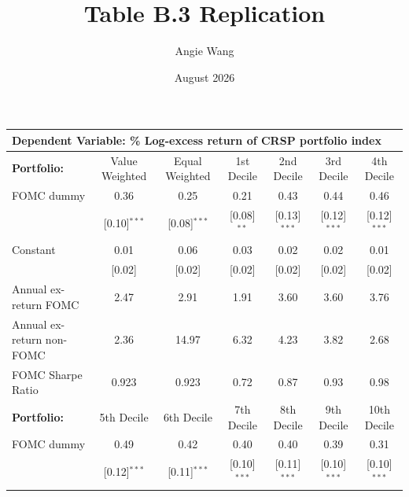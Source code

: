 \documentclass[landscape]{article}
\begin{document}
\title{Table B.3 Replication}
\author{Angie Wang}
\date{August 2026}
\maketitle

\begin{table}[htbp]
\centering
\begin{threeparttable}

\setlength{\tabcolsep}{5pt}
\begin{tabular}{lcccccc}

\toprule
\multicolumn{7}{l}{
\textbf{Dependent Variable:} \% Log-excess return of CRSP portfolio index} \\
\midrule
\textbf{Portfolio:} &
Value Weighted &
Equal Weighted & 
1st Decile & 
2nd Decile & 
3rd Decile & 
4th Decile \\
\midrule

FOMC dummy   
& {0.36} & {0.25} & 0.21 & 0.43 & 0.44 & 0.46 \\

{} & [0.10]$^{***}$ & [0.08]$^{***}$ & [0.08]$^{**}$ & [0.13]$^{***}$ & [0.12]$^{***}$ & [0.12]$^{***}$ \\

Constant 
& {0.01} & {0.06} & 0.03 & 0.02 & 0.02 & 0.01 \\

{} & [0.02] & [0.02] & [0.02] & [0.02] & [0.02] & [0.02] \\


\midrule

Annual ex-return FOMC 
& {2.47} & {2.91} & 1.91 & 3.60 & 3.60 & 3.76 \\

Annual ex-return non-FOMC 
& {2.36} & {14.97} & 6.32 & 4.23 & 3.82 & 2.68 \\

FOMC Sharpe Ratio 
& {0.923} & {0.923} & 0.72 & 0.87 & 0.93 & 0.98 \\

\midrule
\midrule

\textbf{Portfolio:} & 
5th Decile & 
6th Decile & 
7th Decile & 
8th Decile &
9th Decile & 
10th Decile \\

\midrule

FOMC dummy
& 0.49 & 0.42 & 0.40 & 0.40 & 0.39 & 0.31 \\

{} & [0.12]$^{***}$ & [0.11]$^{***}$ & [0.10]$^{***}$ & [0.11]$^{***}$ & [0.10]$^{***}$ & [0.10]$^{***}$ \\


\end{tabular}
\end{threeparttable}
\end{table}
\end{document}
